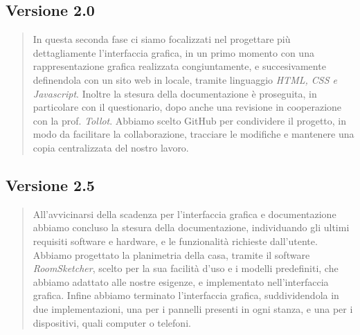 \documentclass[italian, 12pt, a4paper]{article}
\begin{document}
\subsection{Versione 2.0}
\begin{quote}
    In questa seconda fase ci siamo focalizzati nel progettare più dettagliamente l'interfaccia grafica, in un primo momento con una rappresentazione grafica realizzata congiuntamente, e succesivamente definendola con un sito web in locale, tramite linguaggio \emph{HTML, CSS e Javascript}. Inoltre la stesura della documentazione è proseguita, in particolare con il questionario, dopo anche una revisione in cooperazione con la prof. \emph{Tollot}. Abbiamo scelto GitHub per condividere il progetto, in modo da facilitare la collaborazione, tracciare le modifiche e mantenere una copia centralizzata del nostro lavoro.
\end{quote}
\subsection{Versione 2.5}
\begin{quote}
    All'avvicinarsi della scadenza per l'interfaccia grafica e documentazione abbiamo concluso la stesura della documentazione, individuando gli ultimi requisiti software e hardware, e le funzionalità richieste dall'utente. Abbiamo progettato la planimetria della casa, tramite il software \emph{RoomSketcher}, scelto per la sua facilità d'uso e i modelli predefiniti, che abbiamo adattato alle nostre esigenze, e implementato nell'interfaccia grafica. Infine abbiamo terminato l'interfaccia grafica, suddividendola in due implementazioni, una per i pannelli presenti in ogni stanza, e una per i dispositivi, quali computer o telefoni.
\end{quote}
\clearpage
\end{document}
